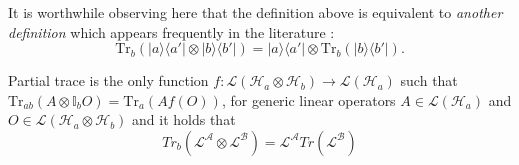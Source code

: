 It is worthwhile observing here that the definition above is equivalent
to \emph{another definition} which appears frequently in the literature
\cite{Nielsen_Chuang_2010}:
\begin{equation}
\mathrm{Tr}_{b}(|a\rangle\langle a'|\otimes|b\rangle\langle b'|)=|a\rangle\langle a'|\otimes\mathrm{Tr}_{b}(|b\rangle\langle b'|).\label{eq:ptr_def2}
\end{equation}

Partial trace is the only function $f:\mathcal{L}(\mathcal{H}_{a}\otimes\mathcal{H}_{b})\rightarrow\mathcal{L}(\mathcal{H}_{a})$
such that $\mathrm{Tr}_{ab}(A\otimes\mathbb{I}_{b}O)=\mathrm{Tr}_{a}(Af(O))$,
for generic linear operators $A\in\mathcal{L}(\mathcal{H}_{a})$ and
$O\in\mathcal{L}(\mathcal{H}_{a}\otimes\mathcal{H}_{b})$ and it holds that 
\begin{equation}
    Tr_{b}(\mathcal{L^A} \otimes \mathcal{L^B}) = \mathcal{L^A}Tr(\mathcal{L^B})
\end{equation}